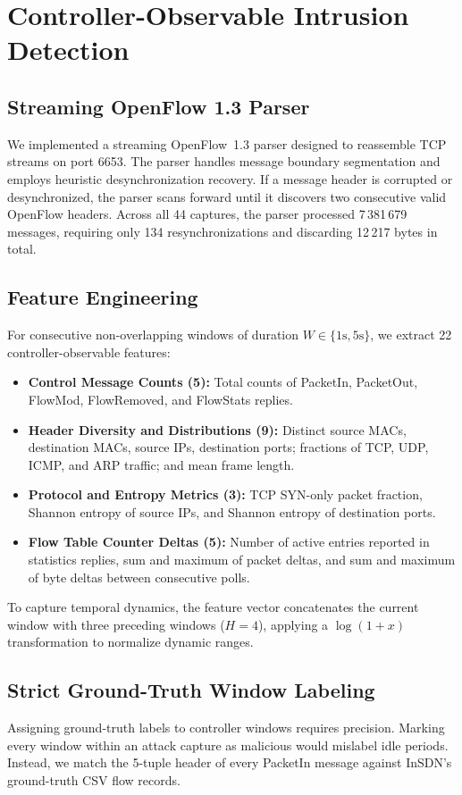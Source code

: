 \documentclass[journal]{IEEEtran}
\begin{document}
\section{Controller-Observable Intrusion Detection}\label{sec:method}
\subsection{Streaming OpenFlow 1.3 Parser}
We implemented a streaming OpenFlow~1.3 parser designed to reassemble TCP streams on port 6653. The parser handles message boundary segmentation and employs heuristic desynchronization recovery. If a message header is corrupted or desynchronized, the parser scans forward until it discovers two consecutive valid OpenFlow headers. Across all 44 captures, the parser processed 7\,381\,679 messages, requiring only 134 resynchronizations and discarding 12\,217 bytes in total.

\subsection{Feature Engineering}
For consecutive non-overlapping windows of duration $W \in \{1\text{s}, 5\text{s}\}$, we extract 22 controller-observable features:
\begin{itemize}
    \item \textbf{Control Message Counts (5):} Total counts of PacketIn, PacketOut, FlowMod, FlowRemoved, and FlowStats replies.
    \item \textbf{Header Diversity and Distributions (9):} Distinct source MACs, destination MACs, source IPs, destination ports; fractions of TCP, UDP, ICMP, and ARP traffic; and mean frame length.
    \item \textbf{Protocol and Entropy Metrics (3):} TCP SYN-only packet fraction, Shannon entropy of source IPs, and Shannon entropy of destination ports.
    \item \textbf{Flow Table Counter Deltas (5):} Number of active entries reported in statistics replies, sum and maximum of packet deltas, and sum and maximum of byte deltas between consecutive polls.
\end{itemize}
To capture temporal dynamics, the feature vector concatenates the current window with three preceding windows ($H=4$), applying a $\log(1+x)$ transformation to normalize dynamic ranges.

\subsection{Strict Ground-Truth Window Labeling}
Assigning ground-truth labels to controller windows requires precision. Marking every window within an attack capture as malicious would mislabel idle periods. Instead, we match the 5-tuple header of every PacketIn message against InSDN's ground-truth CSV flow records.
\end{document}
